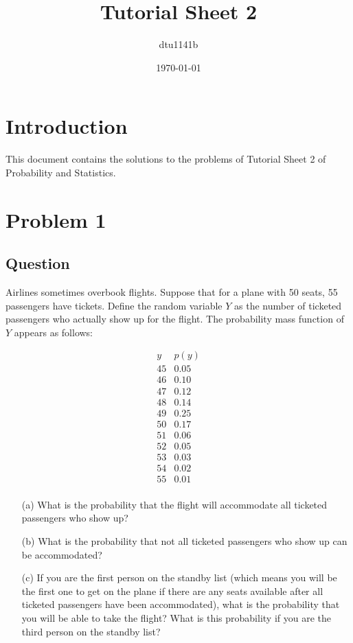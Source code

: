 \documentclass{article}
\title{Tutorial Sheet 2}
\author{dtu1141b}
\date{\today}
\begin{document}
\maketitle

\section*{Introduction}
This document contains the solutions to the problems of Tutorial Sheet 2 of Probability and Statistics.

\section*{Problem 1}
\subsection*{Question}
Airlines sometimes overbook flights. Suppose that for a plane with 50 seats, 55 passengers have tickets. Define the random variable $Y$ as the number of ticketed passengers who actually show up for the flight. The probability mass function of $Y$ appears as follows:

\[
\begin{array}{c|c}
y & p(y) \\
\hline
45 & 0.05 \\
46 & 0.10 \\
47 & 0.12 \\
48 & 0.14 \\
49 & 0.25 \\
50 & 0.17 \\
51 & 0.06 \\
52 & 0.05 \\
53 & 0.03 \\
54 & 0.02 \\
55 & 0.01 \\
\end{array}
\]

\begin{enumerate}
    \item[(a)] What is the probability that the flight will accommodate all ticketed passengers who show up?
    \item[(b)] What is the probability that not all ticketed passengers who show up can be accommodated?
    \item[(c)] If you are the first person on the standby list (which means you will be the first one to get on the plane if there are any seats available after all ticketed passengers have been accommodated), what is the probability that you will be able to take the flight? What is this probability if you are the third person on the standby list?
\end{enumerate}
\end{document}
